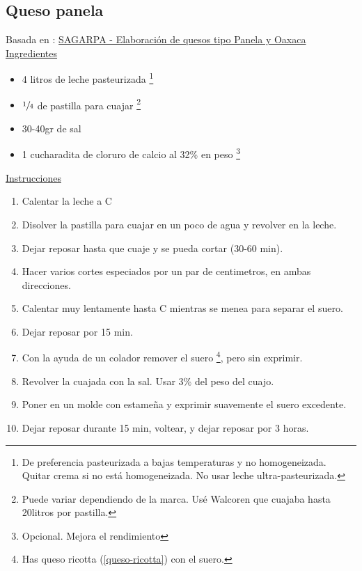\subsection{Queso panela}

Basada en : \href{http://www.sagarpa.gob.mx/desarrolloRural/Documents/fichasaapt/Elaboraci%C3%B3n%20de%20quesos.pdf}{SAGARPA - Elaboración de quesos tipo Panela y Oaxaca} \\

\underline{Ingredientes}
\begin{itemize}
\item 4 litros de leche pasteurizada \footnote{De preferencia pasteurizada a bajas temperaturas y no homogeneizada. Quitar crema si no está homogeneizada. No usar leche ultra-pasteurizada.}
\item $\sfrac{1}{4}$ de pastilla para cuajar \footnote{Puede variar dependiendo de la marca. Usé Walcoren que cuajaba hasta 
\Sim 20litros por pastilla.}
\item 30-40gr de sal
\item 1 cucharadita de cloruro de calcio al 32\% en peso \footnote{Opcional. Mejora el rendimiento}
\end{itemize}


\underline{Instrucciones}
\begin{enumerate}
\item Calentar la leche a  C
\item Disolver la pastilla para cuajar en un poco de agua y revolver en la leche.
\item Dejar reposar hasta que cuaje y se pueda cortar (30-60 min).
\item Hacer varios cortes especiados por un par de centimetros, en ambas direcciones.
\item Calentar muy lentamente hasta  C mientras se menea para separar el suero.
\item Dejar reposar por 15 min.
\item Con la ayuda de un colador remover el suero \footnote{Has queso ricotta (\ref{queso-ricotta}) con el suero.}, pero sin exprimir.
\item Revolver la cuajada con la sal. Usar 3\% del peso del cuajo.
\item Poner en un molde con estame\~na y exprimir suavemente el suero excedente.
\item Dejar reposar durante 15 min, voltear, y dejar reposar por 3 horas.
\end{enumerate}
